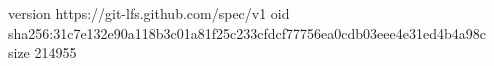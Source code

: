 version https://git-lfs.github.com/spec/v1
oid sha256:31c7e132e90a118b3c01a81f25c233cfdcf77756ea0cdb03eee4e31ed4b4a98c
size 214955
